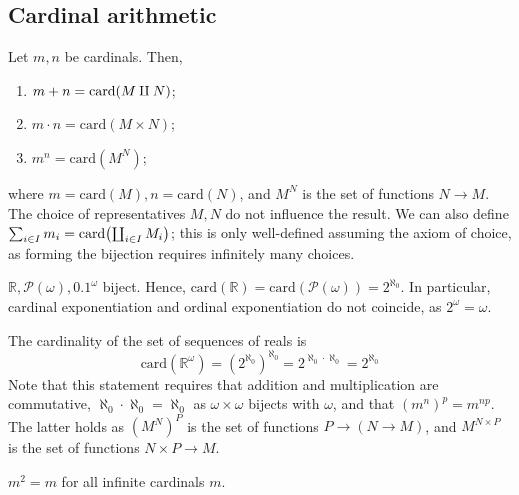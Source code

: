 \subsection{Cardinal arithmetic}
Let \( m, n \) be cardinals.
Then,
\begin{enumerate}
    \item \( m + n = \mathrm{card}\qty(M \amalg N) \);
    \item \( m \cdot n = \mathrm{card}(M \times N) \);
    \item \( m^n = \mathrm{card}(M^N) \);
\end{enumerate}
where \( m = \mathrm{card}(M), n = \mathrm{card}(N) \), and \( M^N \) is the set of functions \( N \to M \).
The choice of representatives \( M, N \) do not influence the result.
We can also define \( \sum_{i \in I} m_i = \mathrm{card}\qty(\coprod_{i \in I} M_i) \); this is only well-defined assuming the axiom of choice, as forming the bijection requires infinitely many choices.
\begin{example}
    \( \mathbb R, \mathcal P(\omega), \qty{0,1}^\omega \) biject.
    Hence, \( \mathrm{card}(\mathbb R) = \mathrm{card}(\mathcal P(\omega)) = 2^{\aleph_0} \).
    In particular, cardinal exponentiation and ordinal exponentiation do not coincide, as \( 2^\omega = \omega \).
    
    The cardinality of the set of sequences of reals is
    \[ \mathrm{card}(\mathbb R^\omega) = (2^{\aleph_0})^{\aleph_0} = 2^{\aleph_0 \cdot \aleph_0} = 2^{\aleph_0} \]
    Note that this statement requires that addition and multiplication are commutative, \( \aleph_0 \cdot \aleph_0 = \aleph_0 \) as \( \omega \times \omega \) bijects with \( \omega \), and that \( (m^n)^p = m^{np} \).
    The latter holds as \( (M^N)^P \) is the set of functions \( P \to (N \to M) \), and \( M^{N \times P} \) is the set of functions \( N \times P \to M \).
\end{example}
\begin{theorem}
    \( m^2 = m \) for all infinite cardinals \( m \).
\end{theorem}
